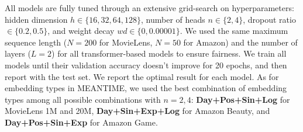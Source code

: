 All models are fully tuned through an extensive grid-search on hyperparameters: hidden dimension $h \in \{16, 32, 64, 128\}$, number of heads $n \in \{2, 4\}$, dropout ratio $\in \{0.2, 0.5\}$, and weight decay $wd \in \{0, 0.00001\}$. We used the same maximum sequence length ($N=200$ for MovieLens, $N=50$ for Amazon) and the number of layers ($L = 2$) for all transformer-based models to ensure fairness. We train all models until their validation accuracy doesn't improve for 20 epochs, and then report with the test set. We report the optimal result for each model.
As for embedding types in MEANTIME, we used the best combination of embedding types among all possible combinations with $n=2, 4$: \textbf{Day+Pos+Sin+Log} for MovieLens 1M and 20M, \textbf{Day+Sin+Exp+Log} for Amazon Beauty, and \textbf{Day+Pos+Sin+Exp} for Amazon Game. 
